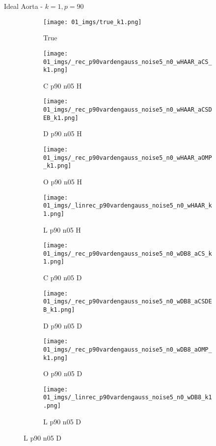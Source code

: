 \begin{frame}{Ideal Aorta - $k=1,p=90$}{}
\begin{figure}
\begin{subfigure}{0.1\textwidth}
\texttt{[image: 01\_imgs/true\_k1.png]}
\caption*{\Tiny True}
\end{subfigure}
\begin{subfigure}{0.1\textwidth}
\texttt{[image: 01\_imgs/\_rec\_p90vardengauss\_noise5\_n0\_wHAAR\_aCS\_k1.png]}
\caption*{\Tiny C p90 n05 H}
\end{subfigure}
\begin{subfigure}{0.1\textwidth}
\texttt{[image: 01\_imgs/\_rec\_p90vardengauss\_noise5\_n0\_wHAAR\_aCSDEB\_k1.png]}
\caption*{\Tiny D p90 n05 H}
\end{subfigure}
\begin{subfigure}{0.1\textwidth}
\texttt{[image: 01\_imgs/\_rec\_p90vardengauss\_noise5\_n0\_wHAAR\_aOMP\_k1.png]}
\caption*{\Tiny O p90 n05 H}
\end{subfigure}
\begin{subfigure}{0.1\textwidth}
\texttt{[image: 01\_imgs/\_linrec\_p90vardengauss\_noise5\_n0\_wHAAR\_k1.png]}
\caption*{\Tiny L p90 n05 H}
\end{subfigure}
\begin{subfigure}{0.1\textwidth}
\texttt{[image: 01\_imgs/\_rec\_p90vardengauss\_noise5\_n0\_wDB8\_aCS\_k1.png]}
\caption*{\Tiny C p90 n05 D}
\end{subfigure}
\begin{subfigure}{0.1\textwidth}
\texttt{[image: 01\_imgs/\_rec\_p90vardengauss\_noise5\_n0\_wDB8\_aCSDEB\_k1.png]}
\caption*{\Tiny D p90 n05 D}
\end{subfigure}
\begin{subfigure}{0.1\textwidth}
\texttt{[image: 01\_imgs/\_rec\_p90vardengauss\_noise5\_n0\_wDB8\_aOMP\_k1.png]}
\caption*{\Tiny O p90 n05 D}
\end{subfigure}
\begin{subfigure}{0.1\textwidth}
\texttt{[image: 01\_imgs/\_linrec\_p90vardengauss\_noise5\_n0\_wDB8\_k1.png]}
\caption*{\Tiny L p90 n05 D}
\end{subfigure}

\vspace{5pt}


\end{figure}
\end{frame}
